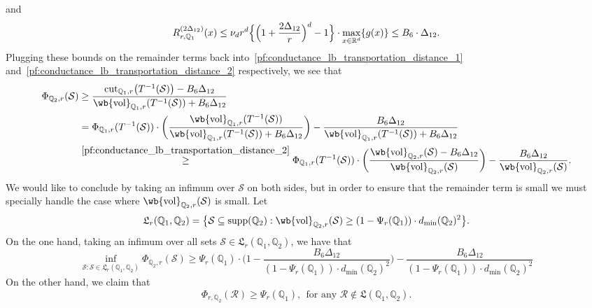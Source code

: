 \documentclass[twoside,11pt]{article}
\newcommand{\Reals}{\mathbb{R}}
\newcommand{\1}{\mathbf{1}}
\newcommand{\Rd}{\Reals^d}
\newcommand{\mc}[1]{\mathcal{#1}}
\newcommand{\mbb}[1]{\mathbb{#1}}
\newcommand{\vol}{\mathrm{vol}}
\newcommand{\cut}{\mathrm{cut}}
\begin{document}
and
\begin{equation*}
R_{r,\mbb{Q}_1}^{(2\Delta_{12})}(x) \leq \nu_dr^d\Bigl\{\Bigl(1 + \frac{2\Delta_{12}}{r}\Bigr)^d - 1\Bigr\} \cdot \max_{x \in \Rd}\{g(x)\} \leq B_6 \cdot \Delta_{12}.
\end{equation*} 
Plugging these bounds on the remainder terms back into~\eqref{pf:conductance_lb_transportation_distance_1} and~\eqref{pf:conductance_lb_transportation_distance_2} respectively, we see that
\begin{align*}
\Phi_{\mbb{Q}_2,r}(\mc{S}) & \geq \frac{\cut_{\mbb{Q}_1,r}\bigl(T^{-1}(\mc{S})\bigr) - B_6 \Delta_{12}}{\wb{\vol}_{\mbb{Q}_1,r}(T^{-1}(\mc{S})) + B_6 \Delta_{12}} \\ & = \Phi_{\mbb{Q}_1,r}(T^{-1}(\mc{S})) \cdot \biggl(\frac{\wb{\vol}_{\mbb{Q}_1,r}(T^{-1}(\mc{S}))}{\wb{\vol}_{\mbb{Q}_1,r}(T^{-1}(\mc{S})) + B_6\Delta_{12}}\biggr) - \frac{B_6\Delta_{12}}{\wb{\vol}_{\mbb{Q}_1,r}(T^{-1}(\mc{S})) + B_6\Delta_{12}} \\
& \overset{\eqref{pf:conductance_lb_transportation_distance_2}}{\geq} \Phi_{\mbb{Q}_1,r}(T^{-1}(\mc{S})) \cdot \biggl(\frac{\wb{\vol}_{\mbb{Q}_2,r}(\mc{S}) - B_6\Delta_{12}}{\wb{\vol}_{\mbb{Q}_2,r}(\mc{S})}\biggr) - \frac{B_6\Delta_{12}}{\wb{\vol}_{\mbb{Q}_2,r}(\mc{S})}.
\end{align*}
We would like to conclude by taking an infimum over $\mc{S}$ on both sides, but in order to ensure that the remainder term is small we must specially handle the case where $\wb{\vol}_{\mbb{Q}_2,r}(\mc{S})$ is small. Let
\begin{equation*}
\mathfrak{L}_{r}(\mbb{Q}_1,\mbb{Q}_2) = \bigl\{\mc{S} \subseteq \mathrm{supp}(\mbb{Q}_2): \wb{\vol}_{\mbb{Q}_2,r}(\mc{S}) \geq (1 - \Psi_r(\mbb{Q}_1)) \cdot d_{\min}(\mbb{Q}_2)^2 \bigr\}.
\end{equation*}
On the one hand, taking an infimum over all sets $\mc{S} \in \mathfrak{L}_{r}(\mbb{Q}_1,\mbb{Q}_2)$, we have that
\begin{equation*}
\inf_{\mc{S}: \mc{S} \in \mathfrak{L}_{r}(\mbb{Q}_1,\mbb{Q}_2)} \Phi_{\mbb{Q}_2,r}(\mc{S}) \geq \Psi_{r}(\mbb{Q}_1) \cdot \biggl(1 - \frac{B_6 \Delta_{12}}{(1 - \Psi_r(\mbb{Q}_1)) \cdot d_{\min}(\mbb{Q}_2)^2}\biggr) - \frac{B_6\Delta_{12}}{(1 - \Psi_r(\mbb{Q}_1)) \cdot d_{\min}(\mbb{Q}_2)^2}
\end{equation*}
On the other hand, we claim that 
\begin{equation}
\label{pf:conductance_lb_transportation_distance_3}
\Phi_{r,\mbb{Q}_2}(\mc{R}) \geq \Psi_{r}(\mbb{Q}_1),~~\textrm{for any $\mc{R} \not\in \mathfrak{L}(\mbb{Q}_1,\mbb{Q}_2)$}.
\end{equation}
\end{document}
